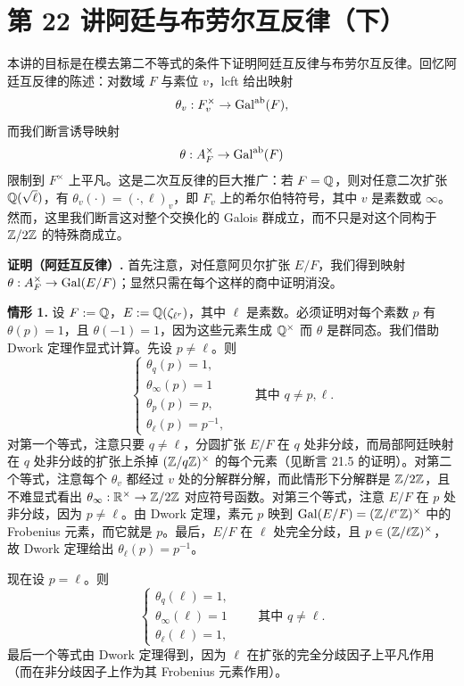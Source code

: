 \section*{第 22 讲\quad 阿廷与布劳尔互反律（下）}

本讲的目标是在模去第二不等式的条件下证明阿廷互反律与布劳尔互反律。回忆阿廷互反律的陈述：对数域 $F$ 与素位 $v$，lcft 给出映射
\[
\theta_v:F_v^\times\to\operatorname{Gal}^{\mathrm{ab}}(F),
\]
而我们断言诱导映射
\[
\theta:A_F^\times\to\operatorname{Gal}^{\mathrm{ab}}(F)
\]
限制到 $F^\times$ 上平凡。这是二次互反律的巨大推广：若 $F=\mathbb{Q}$，则对任意二次扩张 $\mathbb{Q}(\sqrt{\ell})$，有 $\theta_v(\cdot)=(\cdot,\ell)_v$，即 $F_v$ 上的希尔伯特符号，其中 $v$ 是素数或 $\infty$。
然而，这里我们断言这对整个交换化的 Galois 群成立，而不只是对这个同构于 $\mathbb{Z}/2\mathbb{Z}$ 的特殊商成立。

\textbf{证明（阿廷互反律）.} 首先注意，对任意阿贝尔扩张 $E/F$，我们得到映射 $\theta:A_F^\times\to\operatorname{Gal}(E/F)$；显然只需在每个这样的商中证明消没。

\textbf{情形 1.} 设 $F:=\mathbb{Q}$，$E:=\mathbb{Q}(\zeta_{\ell^r})$，其中 $\ell$ 是素数。必须证明对每个素数 $p$ 有 $\theta(p)=1$，且 $\theta(-1)=1$，因为这些元素生成 $\mathbb{Q}^\times$ 而 $\theta$ 是群同态。我们借助 Dwork 定理作显式计算。先设 $p\ne\ell$。则
\[
\begin{cases}
\theta_q(p)=1,\\
\theta_\infty(p)=1\\
\theta_p(p)=p,\\
\theta_\ell(p)=p^{-1},
\end{cases}
\qquad\text{其中 } q\ne p,\ell.
\]
对第一个等式，注意只要 $q\ne\ell$，分圆扩张 $E/F$ 在 $q$ 处非分歧，而局部阿廷映射在 $q$ 处非分歧的扩张上杀掉 $(\mathbb{Z}/q\mathbb{Z})^\times$ 的每个元素（见断言 21.5 的证明）。对第二个等式，注意每个 $\theta_v$ 都经过 $v$ 处的分解群分解，而此情形下分解群是 $\mathbb{Z}/2\mathbb{Z}$，且不难显式看出 $\theta_\infty:\mathbb{R}^\times\to\mathbb{Z}/2\mathbb{Z}$ 对应符号函数。对第三个等式，注意 $E/F$ 在 $p$ 处非分歧，因为 $p\ne\ell$。由 Dwork 定理，素元 $p$ 映到 $\operatorname{Gal}(E/F)=(\mathbb{Z}/\ell^r\mathbb{Z})^\times$ 中的 Frobenius 元素，而它就是 $p$。最后，$E/F$ 在 $\ell$ 处完全分歧，且 $p\in(\mathbb{Z}/\ell\mathbb{Z})^\times$，故 Dwork 定理给出 $\theta_\ell(p)=p^{-1}$。

现在设 $p=\ell$。则
\[
\begin{cases}
\theta_q(\ell)=1,\\
\theta_\infty(\ell)=1\\
\theta_\ell(\ell)=1,
\end{cases}
\qquad\text{其中 } q\ne\ell.
\]
最后一个等式由 Dwork 定理得到，因为 $\ell$ 在扩张的完全分歧因子上平凡作用（而在非分歧因子上作为其 Frobenius 元素作用）。

